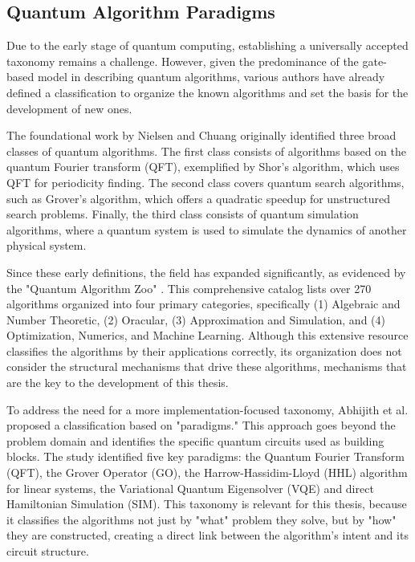 \documentclass{article}
\begin{document}
\subsection{Quantum Algorithm Paradigms}
\label{subsec:paradigms}

Due to the early stage of quantum computing, establishing a universally accepted taxonomy remains a challenge. However, given the predominance of the gate-based model in describing quantum algorithms, various authors have already defined a classification to organize the known algorithms and set the basis for the development of new ones.

The foundational work by Nielsen and Chuang \cite{nielsenQuantumComputationQuantum_2010} originally identified three broad classes of quantum algorithms. The first class consists of algorithms based on the quantum Fourier transform (QFT), exemplified by Shor's algorithm, which uses QFT for periodicity finding. The second class covers quantum search algorithms, such as Grover's algorithm, which offers a quadratic speedup for unstructured search problems. Finally, the third class consists of quantum simulation algorithms, where a quantum system is used to simulate the dynamics of another physical system.

Since these early definitions, the field has expanded significantly, as evidenced by the "Quantum Algorithm Zoo" \cite{QuantumAlgorithmZoo}. This comprehensive catalog lists over 270 algorithms organized into four primary categories, specifically (1) Algebraic and Number Theoretic, (2) Oracular, (3) Approximation and Simulation, and (4) Optimization, Numerics, and Machine Learning. Although this extensive resource classifies the algorithms by their applications correctly, its organization does not consider the structural mechanisms that drive these algorithms, mechanisms that are the key to the development of this thesis.

To address the need for a more implementation-focused taxonomy, Abhijith et al. \cite{jQuantumAlgorithmImplementations_2022} proposed a classification based on "paradigms." This approach goes beyond the problem domain and identifies the specific quantum circuits used as building blocks. The study identified five key paradigms: the Quantum Fourier Transform (QFT), the Grover Operator (GO), the Harrow-Hassidim-Lloyd (HHL) algorithm for linear systems, the Variational Quantum Eigensolver (VQE) and direct Hamiltonian Simulation (SIM). This taxonomy is relevant for this thesis, because it classifies the algorithms not just by "what" problem they solve, but by "how" they are constructed, creating a direct link between the algorithm's intent and its circuit structure.
\end{document}

